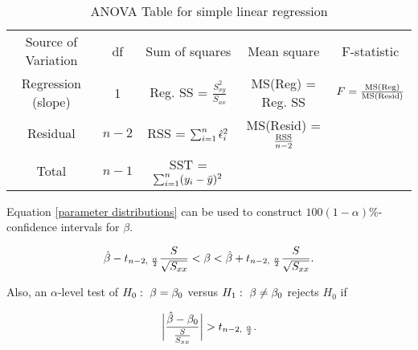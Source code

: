 \documentclass{homework}
\begin{document}
\begin{table}
    \centering
    \caption{ANOVA Table for simple linear regression}
    \begin{tabular}{*5c}
        \toprule
        Source of Variation & df  & Sum of squares & Mean square & F-statistic \\    
        Regression (slope) & 1 & Reg. SS = $\frac{S_{xy}^2}{S_{xx}}$     & MS(Reg) = Reg. SS & $F = \frac{\textnormal {MS(Reg)}}{\textnormal {MS(Resid)}}$ \\
        Residual & $n-2$ & RSS = $\sum_{i=1}^{n} \hat{\epsilon}_i^2$ & MS(Resid) = $\frac{\textnormal{RSS}}{n-2}$  \\
        \hline
        Total & $n-1$ & SST = $\sum_{i=1}^{n} (y_i - \bar{y})^2$ & & \\
        \midrule
        \bottomrule
    \end{tabular}
\end{table}

Equation \eqref{parameter distributions} can be used to construct $100(1-\alpha)\%$-confidence intervals for $\beta$.

\begin{equation}
    \hat{\beta} - t_{n-2, \textnormal{ } \frac{\alpha}{2}} \frac{S}{\sqrt{S_{xx}}}< \beta <\hat{\beta} + t_{n-2, \textnormal{ } \frac{\alpha}{2}} \frac{S}{\sqrt{S_{xx}}}.
\end{equation}

Also, an $\alpha$-level test of $H_0: \textnormal{ } \beta = \beta_0$ versus $H_1: \textnormal{ } \beta \neq \beta_0$ rejects $H_0$ if 

\begin{equation}
    \bigg|\frac{\hat{\beta} - \beta_0}{\frac{S}{S_{xx}}}\bigg| > t_{n-2, \textnormal{ } \frac{\alpha}{2}}.
\end{equation}
\end{document}
